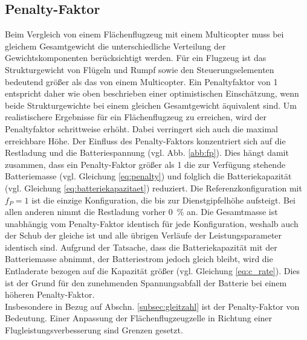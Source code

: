 \subsection{Penalty-Faktor}
\label{subsec:f_p}
Beim Vergleich von einem Flächenflugzeug mit einem Multicopter muss bei gleichem Gesamtgewicht die unterschiedliche Verteilung der Gewichtskomponenten berücksichtigt werden. Für ein Flugzeug ist das Strukturgewicht von Flügeln und Rumpf sowie den Steuerungselementen bedeutend größer als das von einem Multicopter. Ein Penaltyfaktor von 1 entspricht daher wie oben beschrieben einer optimistischen Einschätzung, wenn beide Strukturgewichte bei einem gleichen Gesamtgewicht äquivalent sind. Um realistischere Ergebnisse für ein Flächenflugzeug zu erreichen, wird der Penaltyfaktor schrittweise erhöht. Dabei verringert sich auch die maximal erreichbare Höhe.
Der Einfluss des Penalty-Faktors konzentriert sich auf die Restladung und die Batteriespannung (vgl. Abb. \ref{abb:fp}). Dies hängt damit zusammen, dass ein Penalty-Faktor größer als 1 die zur Verfügung stehende Batteriemasse (vgl. Gleichung \ref{eq:penalty}) und folglich die Batteriekapazität (vgl. Gleichung \ref{eq:batteriekapazitaet}) reduziert. Die Referenzkonfiguration mit \ensuremath{f_P = 1} ist die einzige Konfiguration, die bis zur Dienstgipfelhöhe aufsteigt. Bei allen anderen nimmt die Restladung vorher \SI{0}{\%} an. Die Gesamtmasse ist unabhängig vom Penalty-Faktor identisch für jede Konfiguration, weshalb auch der Schub der gleiche ist und alle übrigen Verläufe der Leistungsparameter identisch sind. 
Aufgrund der Tatsache, dass die Batteriekapazität mit der Batteriemasse abnimmt, der Batteriestrom jedoch gleich bleibt, wird die Entladerate bezogen auf die Kapazität größer (vgl. Gleichung \ref{eq:c_rate}). Dies ist der Grund für den zunehmenden Spannungsabfall der Batterie bei einem höheren Penalty-Faktor.\\
Insbesondere in Bezug auf Abschn. \ref{subsec:gleitzahl} ist der Penalty-Faktor von Bedeutung. Einer Anpassung der Flächenflugzeugzelle in Richtung einer Flugleistungsverbesserung sind Grenzen gesetzt. 


